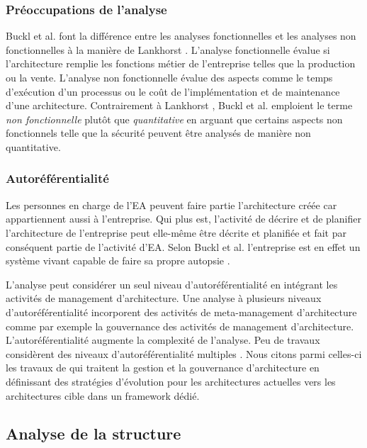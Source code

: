 \subsubsection{Préoccupations de l'analyse}

Buckl et al. \cite{buckl2009classifying} font la différence entre les analyses fonctionnelles et les analyses non
fonctionnelles à la manière de Lankhorst \cite{lankhorst2013enterprise}. L'analyse fonctionnelle évalue si l'architecture remplie les fonctions métier de l'entreprise telles que la production ou la vente. L'analyse non fonctionnelle évalue des aspects comme le
temps d'exécution d'un processus ou le coût de l'implémentation et de
maintenance d'une architecture. Contrairement à Lankhorst \cite{lankhorst2013enterprise}, Buckl et al. \cite{buckl2009classifying}
emploient le terme \textit{non fonctionnelle} plutôt que \textit{quantitative}
en arguant que certains aspects non fonctionnels telle que la sécurité peuvent être analysés de manière non quantitative. 

\subsubsection{Autoréférentialité}

Les personnes en charge de l'EA peuvent faire partie
l'architecture créée car appartiennent aussi à l'entreprise. Qui plus est,
l'activité de décrire et de planifier l'architecture de l'entreprise peut
elle-même être décrite et planifiée et fait par conséquent partie de l'activité
d'EA. Selon Buckl et al.  \cite{varela1974autopoiesis}
l'entreprise est en effet un système vivant capable de faire sa propre autopsie
\cite{varela1974autopoiesis}.

L'analyse peut considérer un seul niveau d'autoréférentialité en intégrant les
activités de management d'architecture. Une analyse à plusieurs niveaux
d'autoréférentialité incorporent des activités de meta-management
d'architecture comme par exemple la gouvernance des activités de management
d'architecture.  L'autoréférentialité augmente la complexité de l'analyse. Peu de
travaux considèrent des niveaux d'autoréférentialité multiples
\cite{smook2014executable}. Nous citons parmi celles-ci les travaux de
\cite{metrailler_evolis_2014} qui traitent la gestion et la gouvernance
d'architecture en définissant des stratégies d'évolution pour les architectures
actuelles vers les architectures cible dans un framework dédié. 


\subsection{Analyse de la structure}

